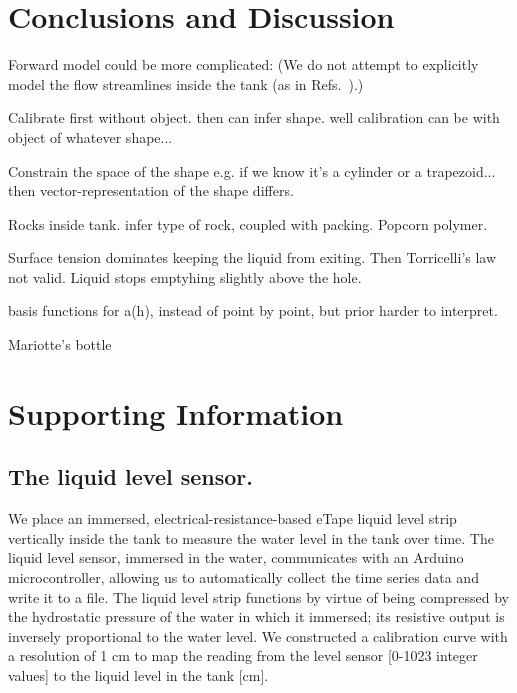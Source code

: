 \documentclass[openacc]{rsproca_new}%
\begin{document}
\section{Conclusions and Discussion}

Forward model could be more complicated: (We do not attempt to explicitly model the flow streamlines inside the tank (as in Refs.~\cite{mathew2014numerical,sakri2017numerical}).)

Calibrate first without object. then can infer shape. well calibration can be with object of whatever shape...

Constrain the space of the shape e.g. if we know it's a cylinder or a trapezoid... then vector-representation of the shape differs.

Rocks inside tank. infer type of rock, coupled with packing. Popcorn polymer.

Surface tension dominates keeping the liquid from exiting. Then Torricelli's law not valid. Liquid stops emptyhing slightly above the hole. 

basis functions for a(h), instead of point by point, but prior harder to interpret.

Mariotte's bottle \cite{kirevs2006mariotte}

\enlargethispage{20pt}


\section{Supporting Information}
\subsection{The liquid level sensor.} 
\label{sec:liq_level_sensor}
We place an immersed, electrical-resistance-based eTape\texttrademark\xspace liquid level strip vertically inside the tank to measure the water level in the tank over time. The liquid level sensor, immersed in the water, communicates with an Arduino microcontroller, allowing us to automatically collect the time series data and write it to a file. The liquid level strip functions by virtue of being compressed by the hydrostatic pressure of the water in which it immersed; its resistive output is inversely proportional to the water level. 
\cite{eTape}
We constructed a calibration curve with a resolution of 1 cm to map the reading from the level sensor [0-1023 integer values] to the liquid level in the tank [cm]. 



\vskip2pc



\end{document}
